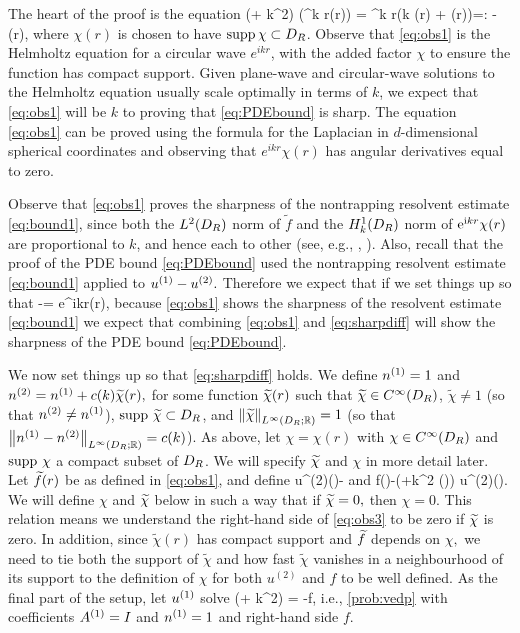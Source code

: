 The heart of the proof is the equation
\beq\label{eq:obs1}
(\Delta + k^2) \big(\re^{\ri k r}\chi(r)\big) =  \re^{\ri k r}\left(\ri k  \chi(r) + \Delta \chi(r)\right)=: -(r),
\eeq
where $\chi(r)$ is chosen to have $\operatorname{supp} \chi \subset D_{R}$. Observe that \cref{eq:obs1} is the Helmholtz equation for a circular wave $e^{ikr}$, with the added factor $\chi$ to ensure the function has compact support. Given plane-wave and circular-wave solutions to the Helmholtz equation usually scale optimally in terms of $k$, we expect that \cref{eq:obs1} will be $k$ to proving that \cref{eq:PDEbound} is sharp. The equation \cref{eq:obs1} can be proved using the formula for the Laplacian in $d$-dimensional spherical coordinates and observing that $e^{ikr} \chi(r)$ has angular derivatives equal to zero.

Observe that \cref{eq:obs1} proves the sharpness of the nontrapping resolvent estimate \cref{eq:bound1}, since both the $L^2(D_{R})$ norm of $\widetilde{f}$ and the $\HokDR$ norm of $\mathrm{e}^{\mathrm{i} kr}\chi(r)$ are proportional to $k$, and hence each to other (see, e.g., \cite[Lemma 3.10]{ChMo:08},  \cite[Lemma 4.12]{Sp:14}). Also, recall that the proof of the PDE bound \cref{eq:PDEbound} used the nontrapping resolvent estimate \cref{eq:bound1} applied to ${u}^{(1)}-{u}^{(2)}.$ Therefore we expect that if we set things up so that
\beq\label{eq:sharpdiff}
\uso-\ust = e^{ikr}\chi(r),
\eeq
because \cref{eq:obs1} shows the sharpness of the resolvent estimate \cref{eq:bound1} we expect that combining \cref{eq:obs1} and \cref{eq:sharpdiff} will show the sharpness of the PDE bound \cref{eq:PDEbound}.

We now set things up so that \cref{eq:sharpdiff} holds. We define ${n}^{(1)} = 1$ and ${n}^{(2)} = {n}^{(1)} + c(k) \widetilde{\chi}(r),$ for some function $\widetilde{\chi}(r)$ such that $\widetilde{\chi}\in C^{\infty}(D_{R})$, $\widetilde{\chi}\not = 1$ (so that ${n}^{(2)}\not = {n}^{(1)}$), $\operatorname{supp} \, \widetilde{\chi} \subset D_{R}$, and $\NLiDRRR{\chitilde} = 1$ (so that $\NLiDRRR{\nso-\nst} = c(k)$).   As above, let $\chi=\chi(r)$ with $\chi \in C^{\infty}(D_{R})$ and $\operatorname{supp} \,\chi$ a compact subset of $D_{R}$. We will specify $\widetilde{\chi}$ and $\chi$ in more detail later. Let $\widetilde{f}(r)$ be as defined in \cref{eq:obs1}, and define
\beq\label{eq:obs3}
u^{(2)}(\bx)\de -
\eeq
and
\beqs
f(\bx)\de -\big(\Delta +k^2 \nst(\bx)\big) u^{(2)}(\bx).
\eeqs
We will define $\chi$ and $\widetilde{\chi}$ below in such a way that if $\widetilde{\chi}=0,$ then $\chi = 0$. This relation means we understand the right-hand side of \cref{eq:obs3} to be zero if $\widetilde{\chi}$ is zero. In addition, since $\widetilde{\chi}(r)$ has compact support and $\widetilde{f}$ depends on $\chi,$ we need to tie both the support of $\widetilde{\chi}$ and how fast $\widetilde{\chi}$ vanishes in a neighbourhood of its support to the definition of $\chi$ for both $u^{(2)}$ and $f$ to be well defined. As the final part of the setup, let ${u}^{(1)}$ solve
\beqs
\mleft(\Delta + k^2\mright) \uso = -f,
\eeqs
i.e., \cref{prob:vedp} with coefficients ${A}^{(1)} = I$ and ${n}^{(1)} =1$ and right-hand side $f$.

